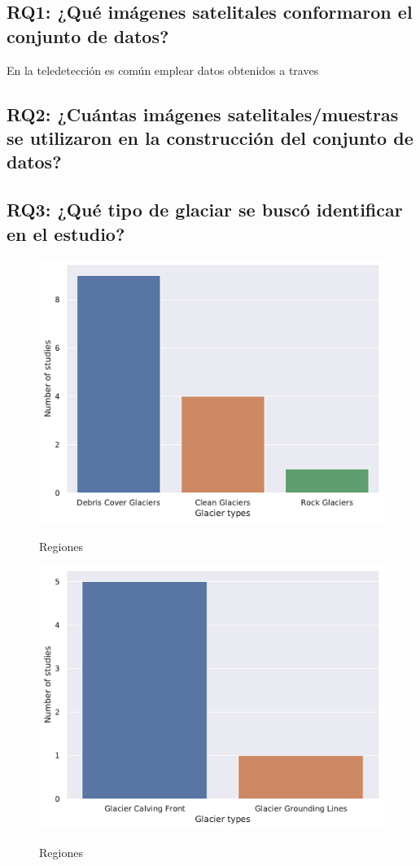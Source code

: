 \documentclass{article}
\begin{document}
\subsection{RQ1: ¿Qué imágenes satelitales conformaron el conjunto de datos?}

En la teledetección es común emplear datos obtenidos a traves

\cite{zhang2021automated}
\cite{Nijhawan2018}

\subsection{RQ2: ¿Cuántas imágenes satelitales/muestras se utilizaron en la construcción del conjunto de datos?}


\subsection{RQ3: ¿Qué tipo de glaciar se buscó identificar en el estudio?}

\begin{figure}[H]
    \centering
    \includegraphics[width=.6\textwidth]{images/fr_glacier_type_1.pdf}
    \label{fig:picoc}
    \caption{Regiones}
\end{figure}

\begin{figure}[H]
    \centering
    \includegraphics[width=.6\textwidth]{images/fr_glacier_type_2.pdf}
    \label{fig:picoc}
    \caption{Regiones}
\end{figure}
\end{document}
